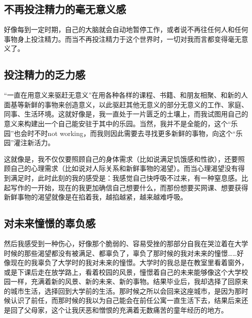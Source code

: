 





\subsection*{不再投注精力的毫无意义感}

好像每到一定时期，自己的大脑就会自动地暂停工作，或者说不再往任何人和任何事物身上投注精力。而当不再投注精力于这个世界时，一切对我而言都变得毫无意义了。







\subsection*{投注精力的乏力感}

“一直在用意义来驱赶无意义”\pozhehao{}在用各种各样的课程、书籍、和朋友相聚、和新的人面基等新鲜的事物来创造意义，以此驱赶其他无意义的部分\pozhehao{}无意义的工作、家庭、同事、生活环境。这就好像是，我一直处于一片匮乏的土壤上，而我试图用自己的意义来构建出一个自己能安驻于其中的乐园。当然，我并不是全能的，这个“乐园”也会时不时not working，而我则因此需要去寻找更多新鲜的事物，向这个“乐园”灌注新活力。

这就像是，我不仅仅要照顾自己的身体需求（比如说满足饥饿感和性欲），还要照顾自己的心理需求（比如说对人际关系和新鲜事物的渴望）。而当心理渴望没有得到满足时，此时此刻的我的感受是：我感觉自己快呼吸不过来，有一种窒息感。比起写作的一开始，现在的我更加确信自己想要什么，而那份想要买网课、想要获得新鲜事物的渴望就像是在掐着我，越掐越紧，越来越难呼吸。







\subsection*{对未来憧憬的辜负感}

然后我感受到一种伤心，好像那个脆弱的、容易受挫的那部分自我在哭泣着在大学时候的那些渴望都没有被满足、都辜负了，辜负了那时候的我对未来的憧憬……好像现在的我辜负了大学时的我对未来的憧憬。大学时的我总是在教室里看着窗外，或是下课后走在放学路上，看着校园的风景，憧憬着自己的未来能够像这个大学校园一样，充满着新的风景、新的未来、新的事物。结果毕业后，我却选择了回原来的城市生活，选择回到大学前的生活。那时候之所以会回来这座城市，是因为那时候认识了前任，而那时候的我以为自己能会在前任公寓一直生活下去，结果后来还是回了父母家，这个让我厌恶和憎恨的充满着无数痛苦的童年经历的地方。

